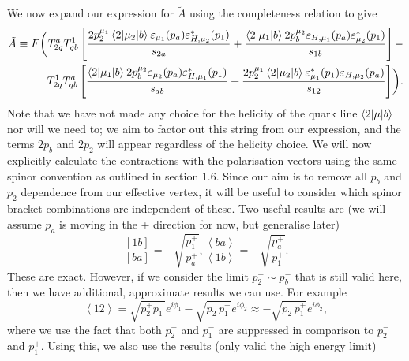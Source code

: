 We now expand our expression for $\tilde{A}$ using the completeness relation to give
\begin{equation}
\begin{split}
\tilde{A} \equiv F \biggl( T^a_{2q}T^1_{qb} \left[ \frac{2 p_2^{\mu_1} \mathinner{\langle2\vert\mu_2\vert b\rangle}_{} \varepsilon_{\mu_1} (p_a) \varepsilon_{H,\mu_2}^*(p_1)}{s_{2a}} + \frac{\mathinner{\langle2\vert\mu_1\vert b\rangle}_{} 2 p_b^{\mu_2} \varepsilon_{H,\mu_1}(p_a)\varepsilon^*_{\mu_2}(p_1)}{s_{1b}} \right]
 - \\
T^1_{2q}T^a_{qb} \left[ \frac{\mathinner{\langle2\vert\mu_1\vert b\rangle}_{}2p_b^{\mu_2}\varepsilon_{\mu_2}(p_a)\varepsilon^*_{H,\mu_1}(p_1)}{s_{ab}} + \frac{2p_2^{\mu_1}\mathinner{\langle2\vert\mu_2\vert b\rangle}_{} \varepsilon_{\mu_1}^*(p_1) \varepsilon_{H,\mu_2}(p_a)}{s_{12}} \right] \biggr).
\end{split}
\end{equation}
Note that we have not made any choice for the helicity of the quark line $\mathinner{\langle2\vert\mu\vert b\rangle}_{}$ nor will we need to; we aim to factor out this string from our expression, and the terms $2p_b$ and $2p_2$ will appear regardless of the helicity choice. We will now explicitly calculate the contractions with the polarisation vectors using the same spinor convention as outlined in section 1.6. Since our aim is to remove all $p_b$ and $p_2$ dependence from our effective vertex, it will be useful to consider which spinor bracket combinations are independent of these. Two useful results are (we will assume $p_a$ is moving in the + direction for now, but generalise later) %
\begin{subequations}
\begin{equation}
\frac{[1b]}{[ba]} = -\sqrt{\frac{p_1^+}{p_a^+}},
\end{equation}
\begin{equation}
\frac{\left<ba\right>}{\left<1b\right>} = -\sqrt{\frac{p_a^+}{p_1^+}}.
\end{equation}
\end{subequations}
These are exact. However, if we consider the limit $p_2^- \sim p_b^-$ that is still valid here, then we have additional, approximate results we can use. For example
\begin{equation}
\left<1 2 \right> = \sqrt{p_2^+ p_1^-} e^{i \phi_1} - \sqrt{p_2^- p_1^+}e^{i \phi_2} \approx  - \sqrt{p_2^- p_1^+}e^{i \phi_2},
\end{equation}
where we use the fact that both $p_2^+$ and $p_1^-$ are suppressed in comparison to $p_2^-$ and $p_1^+$. Using this, we also use the results (only valid the high energy limit)
